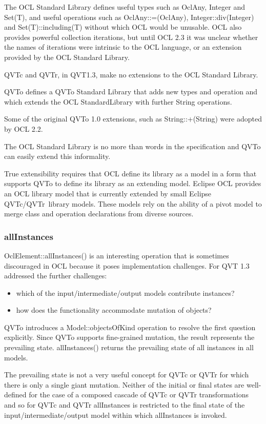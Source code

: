 \documentclass{llncs}
\begin{document}
The OCL Standard Library defines useful types such as OclAny, Integer and Set(T), and useful operations such as OclAny::=(OclAny), Integer::div(Integer) and Set(T)::including(T) without which OCL would be unusable. OCL also provides powerful collection iterations, but until OCL 2.3 it was unclear whether the names of iterations were intrinsic to the OCL language, or an extension provided by the OCL Standard Library.

QVTc and QVTr, in QVT1.3, make no extensions to the OCL Standard Library.

QVTo defines a QVTo Standard Library that adds new types and operation and which extends the OCL StandardLibrary with further String operations.

Some of the original QVTo 1.0 extensions, such as String::+(String) were adopted by OCL 2.2.

The OCL Standard Library is no more than words in the specification and QVTo can easily extend this informality.

True extensibility requires that OCL define its library as a model in a form that supports QVTo to define its library as an extending model. Eclipse OCL provides an OCL library model that is currently extended by small Eclipse QVTc/QVTr~\cite{Eclipse-QVTd}library models. These models rely on the ability of a pivot model to merge class and operation declarations from diverse sources.

\subsubsection{allInstances}

OclElement::allInstances() is an interesting operation that is sometimes discouraged in OCL because it poses implementation challenges. For QVT 1.3 addressed the further challenges:

\begin{itemize}
\item which of the input/intermediate/output models contribute instances?
\item how does the functionality accommodate mutation of objects?  
\end{itemize}

QVTo introduces a Model::objectsOfKind operation to resolve the first question explicitly. Since QVTo supports fine-grained mutation, the result represents the prevailing state. allInstances() returns the prevailing state of all instances in all models.

The prevailing state is not a very useful concept for QVTc or QVTr for which there is only a single giant mutation. Neither of the initial or final states are well-defined for the case of a composed cascade of QVTc or QVTr transformations and so for QVTc and QVTr allInstances is restricted to the final state of the input/intermediate/output model within which allInstances is invoked.
\end{document}

